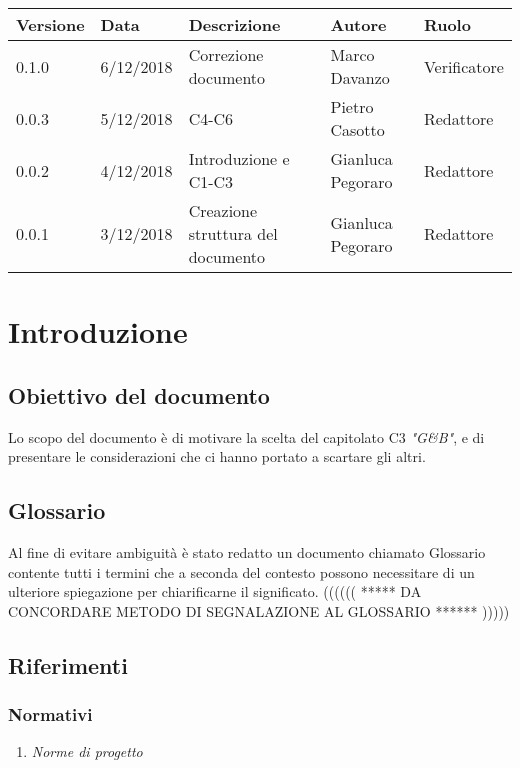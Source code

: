 


\maketitle
\newpage


\begin{tabularx}{\textwidth}{|X|X|X|X|X|}
    \hline
    \textbf{Versione} & \textbf{Data} & \textbf{Descrizione} & \textbf{Autore} & \textbf{Ruolo}\\
    \hline
    0.1.0 & 6/12/2018 & Correzione documento & Marco Davanzo & Verificatore \\
    \hline
    0.0.3 & 5/12/2018 & C4-C6 & Pietro Casotto & Redattore \\
    \hline
    0.0.2 & 4/12/2018 & Introduzione e C1-C3 & Gianluca Pegoraro & Redattore \\
    \hline
    0.0.1 & 3/12/2018 & Creazione struttura del documento & Gianluca Pegoraro & Redattore  \\
    \hline
\end{tabularx}


\newpage




\section{Introduzione}
    \subsection{Obiettivo del documento}
    Lo scopo del documento è di motivare la scelta del capitolato C3 \textit{"G\&B"}, e di presentare le    considerazioni che ci hanno portato a scartare gli altri.
    \subsection{Glossario}
        Al fine di evitare ambiguità è stato redatto un documento chiamato Glossario contente tutti i termini che a seconda del contesto possono necessitare di un ulteriore spiegazione per chiarificarne il   significato. ((((((  *****   DA CONCORDARE METODO DI SEGNALAZIONE AL GLOSSARIO ******   ))))) 
    \subsection{Riferimenti}
        \subsubsection{Normativi}
            \begin{enumerate}
                \item \textit{Norme di progetto}
            \end{enumerate}
